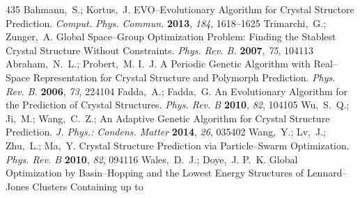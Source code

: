 \documentclass[12pt,letterpaper,oneside]{article}
\begin{document}
\begin{mcitethebibliography}{435}
\EndOfBibitem
{}
Bahmann,~S.; Kortus,~J. EVO--Evolutionary Algorithm for Crystal Structore
  Prediction. \emph{Comput. Phys. Commun.} \textbf{2013}, \emph{184},
  1618--1625\relax
\mciteBstWouldAddEndPuncttrue
\mciteSetBstMidEndSepPunct{\mcitedefaultmidpunct}
{\mcitedefaultendpunct}{\mcitedefaultseppunct}\relax
\EndOfBibitem
{}
Trimarchi,~G.; Zunger,~A. Global Space--Group Optimization Problem: Finding the
  Stablest Crystal Structure Without Constraints. \emph{Phys. Rev. B.}
  \textbf{2007}, \emph{75}, 104113\relax
\mciteBstWouldAddEndPuncttrue
\mciteSetBstMidEndSepPunct{\mcitedefaultmidpunct}
{\mcitedefaultendpunct}{\mcitedefaultseppunct}\relax
\EndOfBibitem
{}
Abraham,~N.~L.; Probert,~M. I.~J. A Periodic Genetic Algorithm with Real--Space
  Representation for Crystal Structure and Polymorph Prediction. \emph{Phys.
  Rev. B.} \textbf{2006}, \emph{73}, 224104\relax
\mciteBstWouldAddEndPuncttrue
\mciteSetBstMidEndSepPunct{\mcitedefaultmidpunct}
{\mcitedefaultendpunct}{\mcitedefaultseppunct}\relax
\EndOfBibitem
{}
Fadda,~A.; Fadda,~G. An Evolutionary Algorithm for the Prediction of Crystal
  Structures. \emph{Phys. Rev. B} \textbf{2010}, \emph{82}, 104105\relax
\mciteBstWouldAddEndPuncttrue
\mciteSetBstMidEndSepPunct{\mcitedefaultmidpunct}
{\mcitedefaultendpunct}{\mcitedefaultseppunct}\relax
\EndOfBibitem
{}
Wu,~S.~Q.; Ji,~M.; Wang,~C.~Z.;   An
  Adaptive Genetic Algorithm for Crystal Structure Prediction. \emph{J. Phys.:
  Condens. Matter} \textbf{2014}, \emph{26}, 035402\relax
\mciteBstWouldAddEndPuncttrue
\mciteSetBstMidEndSepPunct{\mcitedefaultmidpunct}
{\mcitedefaultendpunct}{\mcitedefaultseppunct}\relax
\EndOfBibitem
{}
Wang,~Y.; Lv,~J.; Zhu,~L.; Ma,~Y. Crystal Structure Prediction via
  Particle--Swarm Optimization. \emph{Phys. Rev. B} \textbf{2010}, \emph{82},
  094116\relax
\mciteBstWouldAddEndPuncttrue
\mciteSetBstMidEndSepPunct{\mcitedefaultmidpunct}
{\mcitedefaultendpunct}{\mcitedefaultseppunct}\relax
\EndOfBibitem
{}
Wales,~D.~J.; Doye,~J. P.~K. Global Optimization by Basin--Hopping and the
  Lowest Energy Structures of Lennard--Jones Clusters Containing up to

\end{mcitethebibliography}
\end{document}
